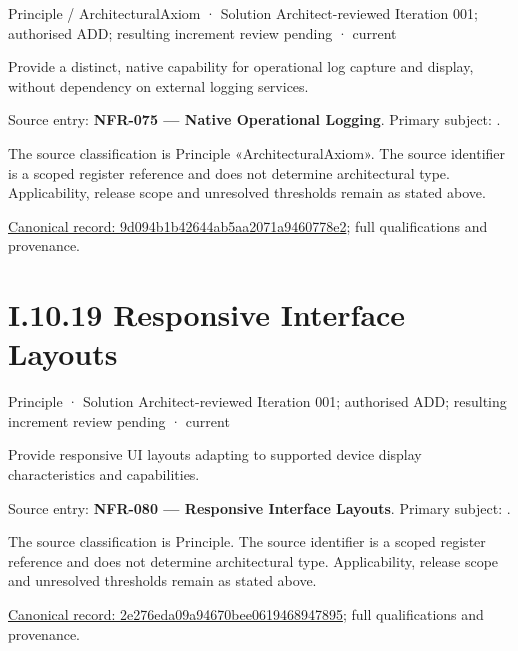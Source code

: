 \label{element:9d094b1b42644ab5aa2071a9460778e2}
{\small Principle / ArchitecturalAxiom · Solution Architect-reviewed Iteration 001; authorised ADD; resulting increment review pending · current}\par

Provide a distinct, native capability for operational log capture and display, without dependency on external logging services.



Source entry: \textbf{NFR-075 — Native Operational Logging}. Primary subject: \texttt{}.



The source classification is Principle «ArchitecturalAxiom». The source identifier is a scoped register reference and does not determine architectural type. Applicability, release scope and unresolved thresholds remain as stated above.


{\footnotesize \href{../../../../continuum/motivation/principle/architectural-axiom/9d094b1b42644ab5aa2071a9460778e2.md}{Canonical record: 9d094b1b42644ab5aa2071a9460778e2}; full qualifications and provenance.}\par
\section*{I.10.19 Responsive Interface Layouts}
\label{navigation:I.10.19}

\label{element:2e276eda09a94670bee0619468947895}
{\small Principle · Solution Architect-reviewed Iteration 001; authorised ADD; resulting increment review pending · current}\par

Provide responsive UI layouts adapting to supported device display characteristics and capabilities.



Source entry: \textbf{NFR-080 — Responsive Interface Layouts}. Primary subject: \texttt{}.



The source classification is Principle. The source identifier is a scoped register reference and does not determine architectural type. Applicability, release scope and unresolved thresholds remain as stated above.


{\footnotesize \href{../../../../continuum/motivation/principle/2e276eda09a94670bee0619468947895.md}{Canonical record: 2e276eda09a94670bee0619468947895}; full qualifications and provenance.}\par
